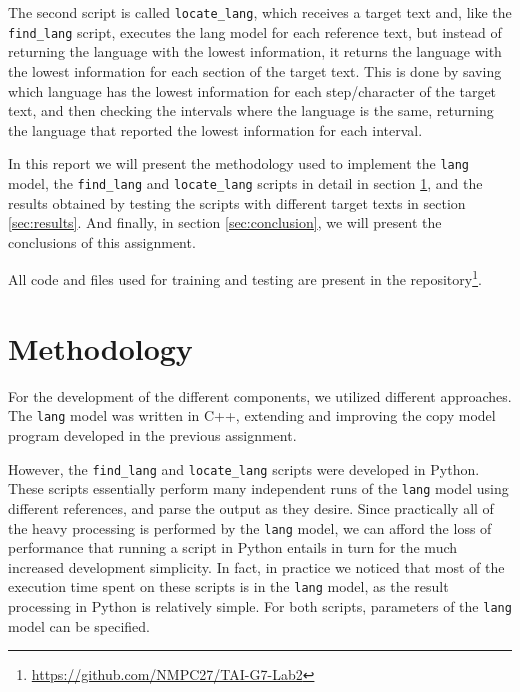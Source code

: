 \documentclass{article}
\begin{document}
The second script is called \texttt{locate\_lang}, which receives a target text and, like the \texttt{find\_lang} script, executes the lang model for each reference text, but instead of returning the language with the lowest information, it returns the language with the lowest information for each section of the target text.
This is done by saving which language has the lowest information for each step/character of the target text, and then checking the intervals where the language is the same, returning the language that reported the lowest information for each interval.

In this report we will present the methodology used to implement the \texttt{lang} model, the \texttt{find\_lang} and \texttt{locate\_lang} scripts in detail in section \ref{sec:methodology}, and the results obtained by testing the scripts with different target texts in section \ref{sec:results}.
And finally, in section \ref{sec:conclusion}, we will present the conclusions of this assignment.

All code and files used for training and testing are present in the repository\footnote{\url{https://github.com/NMPC27/TAI-G7-Lab2}}.

\section{Methodology}
\label{sec:methodology}

For the development of the different components, we utilized different approaches.
The \texttt{lang} model was written in C++, extending and improving the copy model program developed in the previous assignment.

However, the \texttt{find\_lang} and \texttt{locate\_lang} scripts were developed in Python.
These scripts essentially perform many independent runs of the \texttt{lang} model using different references, and parse the output as they desire.
Since practically all of the heavy processing is performed by the \texttt{lang} model, we can afford the loss of performance that running a script in Python entails in turn for the much increased development simplicity.
In fact, in practice we noticed that most of the execution time spent on these scripts is in the \texttt{lang} model, as the result processing in Python is relatively simple.
For both scripts, parameters of the \texttt{lang} model can be specified.
\end{document}

